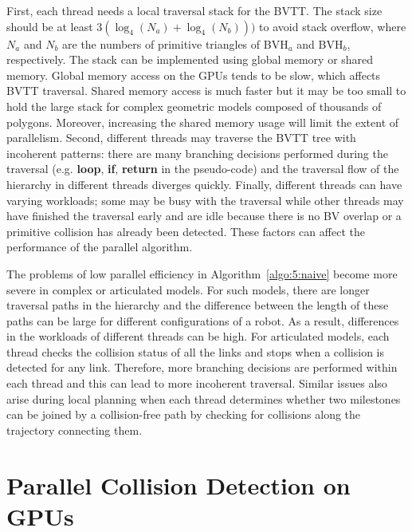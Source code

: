 First, each thread needs a local traversal stack for the BVTT. The stack size should be at least $3 (\log_4(N_a) + \log_4(N_b)))$ to avoid stack overflow, where $N_a$ and $N_b$ are the numbers of primitive triangles of BVH$_a$ and
BVH$_b$, respectively.
The stack can be implemented using global memory or shared memory. Global memory access on the GPUs tends to be slow,
which affects BVTT traversal. Shared memory access is much faster but it may be too small to hold
the large stack for complex geometric models composed of thousands of polygons. Moreover, increasing the shared memory usage will limit the extent of parallelism.
Second, different threads may traverse the BVTT tree with incoherent patterns: there are many branching
decisions performed during the traversal (e.g. \textbf{loop}, \textbf{if}, \textbf{return} in the pseudo-code) and the traversal
flow of the hierarchy in different threads diverges quickly. Finally, different threads can have varying workloads; some may be
busy with the traversal while other threads may have finished the traversal early and are idle because
there is no BV overlap or a primitive collision has already been detected. These factors can affect the
performance of the parallel algorithm.

The problems of low parallel efficiency in Algorithm~\ref{algo:5:naive} become more severe in complex or
articulated models. For such models, there are longer traversal paths in the hierarchy and the difference between
the length of these paths can be large for different configurations of a robot. As a result, differences in the
workloads of different threads can be high. For articulated models, each thread checks the collision status
of all the links and stops when a collision is detected for any link. Therefore, more branching decisions
are performed within each thread and this can lead to more incoherent traversal.
Similar issues also arise during local planning when each thread determines whether two milestones
can be joined by a collision-free path by checking for collisions along the trajectory connecting them.



\section{Parallel Collision Detection on GPUs}
\label{sec:5:algorithm}


